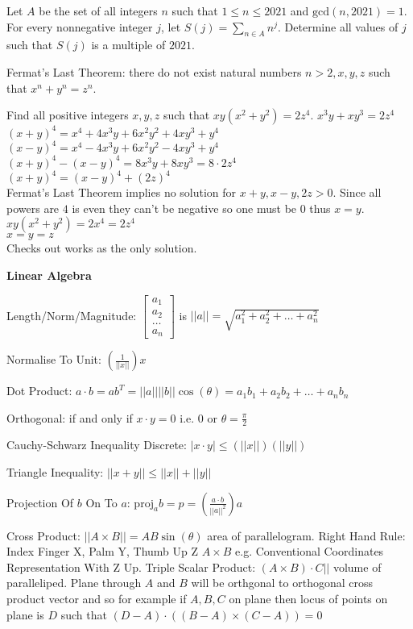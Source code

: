 Let $A$ be the set of all integers $n$ such that $1 \le n \le 2021$ and $\text{gcd}(n,2021)=1$. For every nonnegative integer $j$, let $S(j)=\sum_{n \in A}n^j$. Determine all values of $j$ such that $S(j)$ is a multiple of $2021$.

Fermat's Last Theorem: there do not exist natural numbers $n>2,x,y,z$ such that $x^n+y^n=z^n$.

Find all positive integers $x,y,z$ such that $xy(x^2+y^2)=2z^4$.
$x^3 y + x y^3 = 2 z^4$ \\
$(x+y)^4 = x^4 + 4 x^3 y + 6 x^2 y^2 + 4 x y^3 + y^4$ \\
$(x-y)^4 = x^4 - 4 x^3 y + 6 x^2 y^2 - 4 x y^3 + y^4$ \\
$(x+y)^4-(x-y)^4 = 8 x^3 y + 8 x y^3 = 8 \cdot 2 z^4$ \\
$(x+y)^4 = (x-y)^4 + (2z)^4$ \\
Fermat's Last Theorem implies no solution for $x+y,x-y,2z > 0$. Since all powers are $4$ is even they can't be negative so one must be $0$ thus $x=y$.
$xy(x^2+y^2)=2x^4=2z^4$ \\
$x=y=z$ \\
Checks out works as the only solution.

\newpage

\textbf{Linear Algebra}

Length/Norm/Magnitude: $\begin{bmatrix} a_1 \\ a_2 \\ \dots \\ a_n \end{bmatrix}$ is $||a|| = \sqrt{a_1^2 + a_2^2 + \dots + a_n^2}$

Normalise To Unit: $\left( \frac{1}{||x||} \right) x$

Dot Product: $a \cdot b = a b^{T} = ||a|| ||b|| \cos(\theta) = a_1 b_1 + a_2 b_2 + \dots + a_n b_n$

Orthogonal: if and only if $x \cdot y =0$ i.e. $0$ or $\theta = \frac{\pi}{2}$

Cauchy-Schwarz Inequality Discrete: $|x \cdot y| \le (||x||)(||y||)$

Triangle Inequality: $||x+y|| \le ||x|| + ||y||$

Projection Of $b$ On To $a$: $\text{proj}_a b = p = \left(\frac{a \cdot b}{||a||^2} \right) a$

Cross Product: $||A \times B||=AB\sin(\theta)$ area of parallelogram. Right Hand Rule: Index Finger X, Palm Y, Thumb Up Z $A \times B$ e.g. Conventional Coordinates Representation With Z Up. Triple Scalar Product: $(A \times B) \cdot C||$ volume of paralleliped. Plane through $A$ and $B$ will be orthgonal to orthogonal cross product vector and so for example if $A,B,C$ on plane then locus of points on plane is $D$ such that $(D-A) \cdot ((B-A) \times (C-A))=0$

